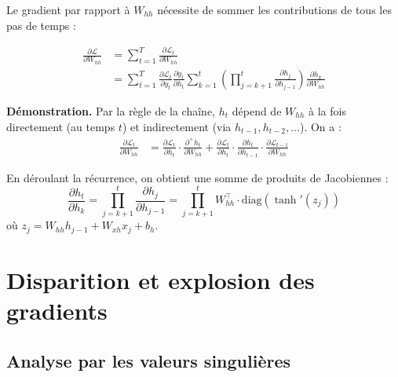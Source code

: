 Le gradient par rapport \`a $W_{hh}$ n\'ecessite de sommer les contributions
de tous les pas de temps :

\begin{theoreme}
\begin{align}
\frac{\partial \mathcal{L}}{\partial W_{hh}}
&= \sum_{t=1}^T \frac{\partial \mathcal{L}_t}{\partial W_{hh}} \nonumber \\
&= \sum_{t=1}^T \frac{\partial \mathcal{L}_t}{\partial y_t}
   \frac{\partial y_t}{\partial h_t}
   \sum_{k=1}^{t} \left(\prod_{j=k+1}^{t}
   \frac{\partial h_j}{\partial h_{j-1}}\right)
   \frac{\partial h_k}{\partial W_{hh}}
\label{eq:bptt-whh}
\end{align}
\end{theoreme}

\textbf{D\'emonstration.}
Par la r\`egle de la cha\^ine, $h_t$ d\'epend de $W_{hh}$ \`a la fois
directement (au temps $t$) et indirectement (via $h_{t-1}, h_{t-2}, \ldots$).
On a :
\begin{align}
\frac{\partial \mathcal{L}_t}{\partial W_{hh}}
&= \frac{\partial \mathcal{L}_t}{\partial h_t}
   \cdot \frac{\partial^+ h_t}{\partial W_{hh}}
   + \frac{\partial \mathcal{L}_t}{\partial h_t}
   \cdot \frac{\partial h_t}{\partial h_{t-1}}
   \cdot \frac{\partial \mathcal{L}_{t-1}}{\partial W_{hh}}
\end{align}

En d\'eroulant la r\'ecurrence, on obtient une somme de produits de Jacobiennes :
\begin{equation}
\frac{\partial h_t}{\partial h_k}
= \prod_{j=k+1}^{t} \frac{\partial h_j}{\partial h_{j-1}}
= \prod_{j=k+1}^{t} W_{hh}^\top \cdot \text{diag}(\tanh'(z_j))
\label{eq:jacobian-product}
\end{equation}
o\`u $z_j = W_{hh} h_{j-1} + W_{xh} x_j + b_h$.

\section{Disparition et explosion des gradients}
\label{sec:vanishing-exploding}

\subsection{Analyse par les valeurs singuli\`eres}

